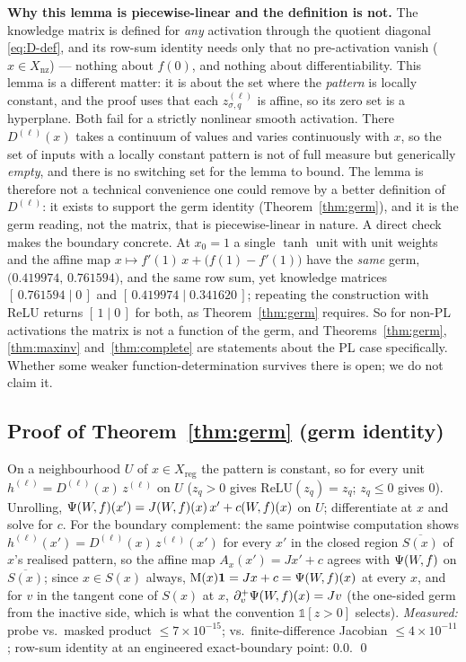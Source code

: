 \begin{clarifybox}
\textbf{Why this lemma is piecewise-linear and the definition is not.} The
knowledge matrix is defined for \emph{any} activation through the
quotient diagonal \eqref{eq:D-def}, and its row-sum identity needs only that no
pre-activation vanish ($x\in X_{\mathrm{nz}}$) --- nothing about $f(0)$, and
nothing about differentiability. This lemma is a different matter: it is about the set
where the \emph{pattern} is locally constant, and the proof uses that each
$z^{(\ell)}_{\sigma,q}$ is affine, so its zero set is a hyperplane. Both fail
for a strictly nonlinear smooth activation. There $D^{(\ell)}(x)$ takes a
continuum of values and varies continuously with $x$, so the set of inputs with
a locally constant pattern is not of full measure but generically \emph{empty},
and there is no switching set for the lemma to bound. The lemma is therefore
not a technical convenience one could remove by a better definition of
$D^{(\ell)}$: it exists to support the germ identity
(Theorem~\ref{thm:germ}), and it is the germ reading, not the matrix, that is
piecewise-linear in nature. A direct check makes the boundary concrete. At
$x_0=1$ a single $\tanh$ unit with unit weights and the affine map
$x\mapsto f'(1)\,x+\bigl(f(1)-f'(1)\bigr)$ have the \emph{same} germ,
$\bigl(0.419974,\,0.761594\bigr)$, and the same row sum, yet knowledge matrices
$[\,0.761594\mid0\,]$ and $[\,0.419974\mid0.341620\,]$; repeating the
construction with ReLU returns $[\,1\mid0\,]$ for both, as
Theorem~\ref{thm:germ} requires. So for non-PL activations the matrix is not a
function of the germ, and Theorems~\ref{thm:germ}, \ref{thm:maxinv}
and~\ref{thm:complete} are statements about the PL case specifically. Whether
some weaker function-determination survives there is open; we do not claim it.
\end{clarifybox}

\subsection{Proof of Theorem~\ref{thm:germ} (germ identity)}

On a neighbourhood $U$ of $x\in X_{\mathrm{reg}}$ the pattern is constant, so
for every unit $h^{(\ell)}=D^{(\ell)}(x)\,z^{(\ell)}$ on $U$ ($z_q>0$ gives
$\mathrm{ReLU}(z_q)=z_q$; $z_q\le0$ gives $0$). Unrolling,
$\Psi(W\!,f)(x')=J(W\!,f)(x)\,x'+c(W\!,f)(x)$ on $U$; differentiate at $x$ and solve for
$c$. For the boundary complement: the same pointwise computation shows
$h^{(\ell)}(x')=D^{(\ell)}(x)\,z^{(\ell)}(x')$ for every $x'$ in the closed
region $\overline{S(x)}$ of $x$'s realised pattern, so the affine map
$A_x(x')=Jx'+c$ agrees with $\Psi(W\!,f)$ on $\overline{S(x)}$; since $x\in S(x)$
always, $\mathrm{M}(x)\mathbf 1=Jx+c=\Psi(W\!,f)(x)$ at every $x$, and for $v$ in the tangent
cone of $S(x)$ at $x$, $\partial^+_v\Psi(W\!,f)(x)=Jv$ (the one-sided germ from the
inactive side, which is what the convention $\mathbb 1[z>0]$ selects).
\emph{Measured:} probe vs.\ masked product $\le 7\times10^{-15}$; vs.\
finite-difference Jacobian $\le 4\times10^{-11}$; row-sum identity at an
engineered exact-boundary point: $0.0$. \qed

